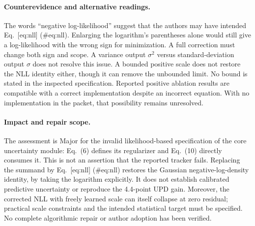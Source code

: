 \documentclass[10pt]{article}
\begin{document}
\paragraph*{Counterevidence and alternative readings.}\mbox{}\par
The words “negative log-likelihood” suggest that the authors may have intended Eq. [eq:nll] (\#eq:nll). Enlarging the logarithm’s parentheses alone would still give a log-likelihood with the wrong sign for minimization. A full correction must change both sign and scope. A variance output \(\sigma^2\) versus standard-deviation output \(\sigma\) does not resolve this issue. A bounded positive scale does not restore the NLL identity either, though it can remove the unbounded limit. No bound is stated in the inspected specification. Reported positive ablation results are compatible with a correct implementation despite an incorrect equation. With no implementation in the packet, that possibility remains unresolved.\par
\paragraph*{Impact and repair scope.}\mbox{}\par
The assessment is Major for the invalid likelihood-based specification of the core uncertainty module: Eq. (6) defines its regularizer and Eq. (10) directly consumes it. This is not an assertion that the reported tracker fails. Replacing the summand by Eq. [eq:nll] (\#eq:nll) restores the Gaussian negative-log-density identity, by taking the logarithm explicitly. It does not establish calibrated predictive uncertainty or reproduce the 4.4-point UPD gain. Moreover, the corrected NLL with freely learned scale can itself collapse at zero residual; practical scale constraints and the intended statistical target must be specified. No complete algorithmic repair or author adoption has been verified.\par
\end{document}
